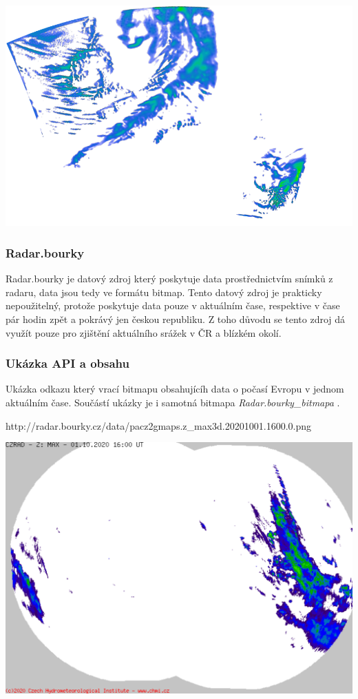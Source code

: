 \documentclass[czech,bachelor,dept460,male,csharp,cpdeclaration]{diploma}
\begin{document}
	\includegraphics[scale=0.5]{Data/Mdrd_ukazka.png}
	
	\subsubsection{Radar.bourky}
	
	Radar.bourky je datový zdroj který poskytuje data prostřednictvím snímků z radaru, data jsou tedy ve formátu bitmap. Tento datový zdroj je prakticky nepoužitelný, protože poskytuje data pouze v aktuálním čase, respektive v čase pár hodin zpět a pokrávý jen českou republiku. Z toho důvodu se tento zdroj dá využít pouze pro zjištění aktuálního srážek v ČR a blízkém okolí.
	
	\subsubsection{Ukázka API a obsahu}
	
	Ukázka odkazu který vrací bitmapu obsahujícíh data o počasí Evropu v jednom aktuálním čase. Součástí ukázky je i samotná bitmapa \emph{Radar.bourky\_bitmapa} \cite{chmi}.
	
	http://radar.bourky.cz/data/pacz2gmaps.z\_max3d.20201001.1600.0.png
	
	\includegraphics[scale=0.5]{Data/Rb_ukazka.png}
	
\end{document}
